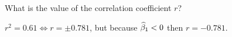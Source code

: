 What is the value of the correlation coefficient $r$?

\soln* $r^2 = 0.61 \iff r = \pm 0.781$, but because $\widehat{\beta}_1 < 0$ then $r = -0.781$.